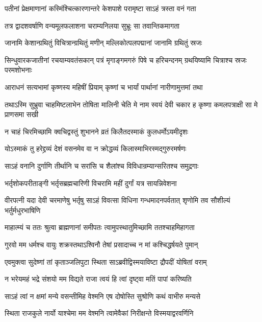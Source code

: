 \twolineshloka
{पतीनां प्रेक्षमाणानां कस्मिंश्चित्कारणान्तरे}
{केशपाशे परामृष्टा साऽहं त्रस्ता वनं गता}


\twolineshloka
{तत्र द्वादशवर्षाणि वन्यमूलफलाशना}
{चराम्यनिलया सुभ्रूः सा तवान्तिकमागता}


\twolineshloka
{जानामि केशान्ग्रथितुं विचित्रान्ग्रथितुं मणीन्}
{मल्लिकोत्पलपद्मानां जानामि ग्रथितुं स्रजः}


\threelineshloka
{सिन्धुवारकजातीनां रचयाम्यवतंसकान्}
{पत्रं मृगाङ्गमगरुं पिषे च हरिचन्दनम्}
{ग्रथयिष्यामि चित्राश्च स्रजः परमशोभनाः}


\twolineshloka
{आराधनं सत्यभामां कृष्णस्य महिषीं प्रियाम्}
{कृष्णां च भार्यां पार्थानां नारीणामुत्तमां तथा}


\threelineshloka
{तथाऽस्मि सुभ्रुवा चाहमिष्टलाभेन तोषिता}
{मालिनी चेति मे नाम स्वयं देवी चकार ह}
{कृष्णा कमलपत्राक्षी सा मे प्राणसमा सखी}


\twolineshloka
{न चाहं चिरमिच्छामि क्वचिद्वस्तुं शुभानने}
{व्रतं किलैतदस्माकं कुलधर्मोऽयमीदृशः}


\twolineshloka
{योऽस्माकं तु हरेद्द्रव्यं देशं वसनमेव वा}
{न क्रोद्धव्यं किलास्माभिरस्मद्गुरुरमर्षणः}


\twolineshloka
{साऽहं वनानि दुर्गाणि तीर्थानि च सरांसि च}
{शैलांश्च विविधान्रम्यान्सरितश्च समुद्रगाः}


\twolineshloka
{भर्तृशोकपरीताङ्गी भर्तृसब्रह्मचारिणी}
{विचरामि महीं दुर्गां यत्र सायन्निवेशना}


\threelineshloka
{वीरपत्नी यदा देवी चरमाणेषु भर्तृषु}
{साऽहं विवत्सा विधिना गन्धमादनपर्वतात्}
{शृणोमि तव सौशील्यं भर्तुर्मधुरभाषिणि}


\twolineshloka
{माहात्म्यं च ततः श्रुत्वा ब्राह्मणानां समीपतः}
{त्वामुपस्थातुमिच्छामि ततश्चाहमिहागता}


\twolineshloka
{गुरवो मम धर्मश्च वायुः शक्रस्तथाऽश्विनौ}
{तेषां प्रसादाच्च न मां कश्चिद्धर्षयते पुमान्}



\twolineshloka
{एवमुक्त्वा सुदेष्णां तां कृताञ्जलिपुटा स्थिता}
{साऽब्रवीद्विस्मयाविष्टा द्रौपदीं योषितां वराम्}


\twolineshloka
{न भरेयमहं भद्रे संशयो मम विद्यते}
{राजा त्वयं हि त्वां दृष्ट्वा मतिं पापां करिष्यति}


\twolineshloka
{साऽहं त्वां न क्षमां मन्ये वसन्तीमिह वेश्मनि}
{एष दोषोस्ति सुश्रोणि कथं वाभीरु मन्यसे}


\twolineshloka
{स्थिता राजकुले नार्यो याश्चेमा मम वेश्मनि}
{त्वामेवैकां निरीक्षन्ते विस्मयाद्वरवर्णिनि}


